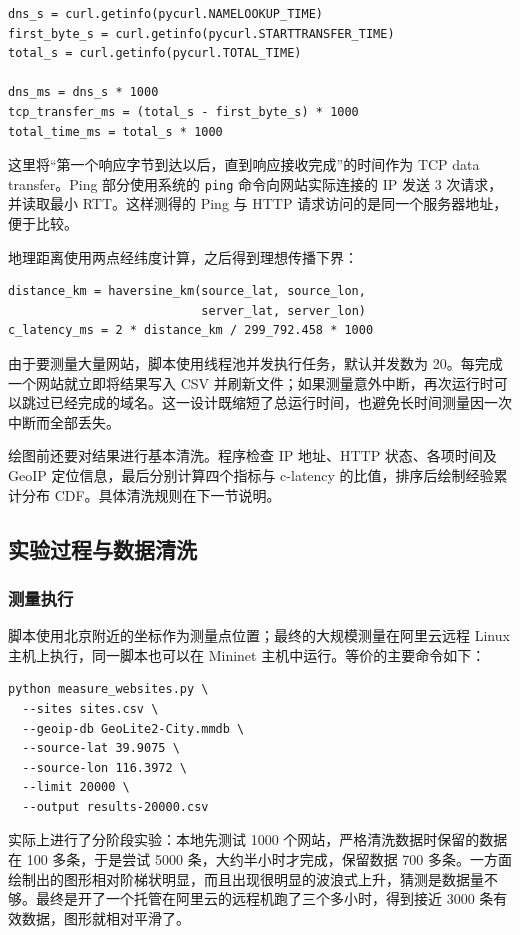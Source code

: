 \documentclass[UTF8,12pt,a4paper,fontset=fandol]{ctexart}
\begin{document}
\begin{verbatim}
dns_s = curl.getinfo(pycurl.NAMELOOKUP_TIME)
first_byte_s = curl.getinfo(pycurl.STARTTRANSFER_TIME)
total_s = curl.getinfo(pycurl.TOTAL_TIME)

dns_ms = dns_s * 1000
tcp_transfer_ms = (total_s - first_byte_s) * 1000
total_time_ms = total_s * 1000
\end{verbatim}

这里将“第一个响应字节到达以后，直到响应接收完成”的时间作为 TCP data transfer。Ping 部分使用系统的 \texttt{ping} 命令向网站实际连接的 IP 发送 3 次请求，并读取最小 RTT。这样测得的 Ping 与 HTTP 请求访问的是同一个服务器地址，便于比较。

地理距离使用两点经纬度计算，之后得到理想传播下界：

\begin{verbatim}
distance_km = haversine_km(source_lat, source_lon,
                           server_lat, server_lon)
c_latency_ms = 2 * distance_km / 299_792.458 * 1000
\end{verbatim}

由于要测量大量网站，脚本使用线程池并发执行任务，默认并发数为 20。每完成一个网站就立即将结果写入 CSV 并刷新文件；如果测量意外中断，再次运行时可以跳过已经完成的域名。这一设计既缩短了总运行时间，也避免长时间测量因一次中断而全部丢失。

绘图前还要对结果进行基本清洗。程序检查 IP 地址、HTTP 状态、各项时间及 GeoIP 定位信息，最后分别计算四个指标与 c-latency 的比值，排序后绘制经验累计分布 CDF。具体清洗规则在下一节说明。

\subsection{实验过程与数据清洗}

\subsubsection{测量执行}

脚本使用北京附近的坐标作为测量点位置；最终的大规模测量在阿里云远程 Linux 主机上执行，同一脚本也可以在 Mininet 主机中运行。等价的主要命令如下：

\begin{verbatim}
python measure_websites.py \
  --sites sites.csv \
  --geoip-db GeoLite2-City.mmdb \
  --source-lat 39.9075 \
  --source-lon 116.3972 \
  --limit 20000 \
  --output results-20000.csv
\end{verbatim}

实际上进行了分阶段实验：本地先测试 1000 个网站，严格清洗数据时保留的数据在 100 多条，于是尝试 5000 条，大约半小时才完成，保留数据 700 多条。一方面绘制出的图形相对阶梯状明显，而且出现很明显的波浪式上升，猜测是数据量不够。最终是开了一个托管在阿里云的远程机跑了三个多小时，得到接近 3000 条有效数据，图形就相对平滑了。
\end{document}
